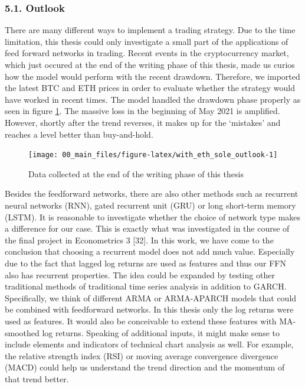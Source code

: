 \documentclass[
]{article}
\begin{document}
\newpage

\hypertarget{outlook}{%
\subsubsection{5.1. Outlook}\label{outlook}}

There are many different ways to implement a trading strategy. Due to
the time limitation, this thesis could only investigate a small part of
the applications of feed forward networks in trading. Recent events in
the cryptocurrency market, which just occured at the end of the writing
phase of this thesis, made us curios how the model would perform with
the recent drawdown. Therefore, we imported the latest BTC and ETH
prices in order to evaluate whether the strategy would have worked in
recent times. The model handled the drawdown phase properly as seen in
figure \ref{fig:with_eth_sole_outlook}. The massive loss in the
beginning of May 2021 is amplified. However, shortly after the trend
reverses, it makes up for the `mistakes' and reaches a level better than
buy-and-hold.

\begin{figure}

{\centering \texttt{[image: 00\_main\_files/figure-latex/with\_eth\_sole\_outlook-1]} 

}

\caption{Data collected at the end of the writing phase of this thesis}\label{fig:with_eth_sole_outlook}
\end{figure}

Besides the feedforward networks, there are also other methods such as
recurrent neural networks (RNN), gated recurrent unit (GRU) or long
short-term memory (LSTM). It is reasonable to investigate whether the
choice of network type makes a difference for our case. This is exactly
what was investigated in the course of the final project in Econometrics
3 {[}32{]}. In this work, we have come to the conclusion that choosing a
recurrent model does not add much value. Especially due to the fact that
lagged log returns are used as features and thus our FFN also has
recurrent properties. The idea could be expanded by testing other
traditional methods of traditional time series analysis in addition to
GARCH. Specifically, we think of different ARMA or ARMA-APARCH models
that could be combined with feedforward networks. In this thesis only
the log returns were used as features. It would also be conceivable to
extend these features with MA-smoothed log returns. Speaking of
additional inputs, it might make sense to include elements and
indicators of technical chart analysis as well. For example, the
relative strength index (RSI) or moving average convergence divergence
(MACD) could help us understand the trend direction and the momentum of
that trend better.
\end{document}
